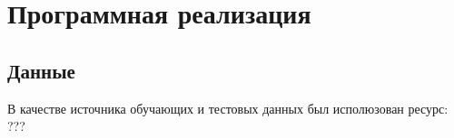 \section{Программная реализация}

\subsection{Данные}
В качестве источника обучающих и тестовых данных был исполюзован ресурс: ???


\clearpage